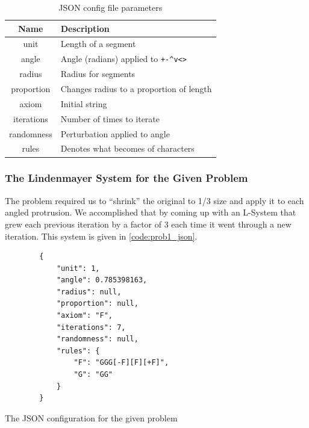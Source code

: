 \begin{table}[H]
    \centering
    \caption{JSON config file parameters}\label{tab:json_format}
    \begin{tabular}{@{}cl@{}}
        \toprule
        \textbf{Name} & \textbf{Description}                                 \\ \midrule
        unit          & Length of a segment                                  \\
        angle         & Angle (radians) applied to \texttt{+-^v<>} \\
        radius        & Radius for segments                                  \\
        proportion    & Changes radius to a proportion of length             \\
        axiom         & Initial string                                       \\
        iterations    & Number of times to iterate                           \\
        randomness    & Perturbation applied to angle                        \\
        rules         & Denotes what becomes of characters                   \\ \bottomrule
    \end{tabular}
\end{table}


\subsubsection{The Lindenmayer System for the Given Problem}
The problem required us to ``shrink'' the original to 1/3 size and apply it to
each angled protrusion. We accomplished that by coming up with an L-System
that grew each previous iteration by a factor of 3 each time it went through a
new iteration. This system is given in \autoref{code:prob1_json}.

\begin{listing}[H]
    \begin{verbatim}
        {
            "unit": 1,
            "angle": 0.785398163,
            "radius": null,
            "proportion": null,
            "axiom": "F",
            "iterations": 7,
            "randomness": null,
            "rules": {
                "F": "GGG[-F][F][+F]",
                "G": "GG"
            }
        }
    \end{verbatim}
    \caption{The JSON configuration for the given problem}\label{code:prob1_json}
\end{listing}

